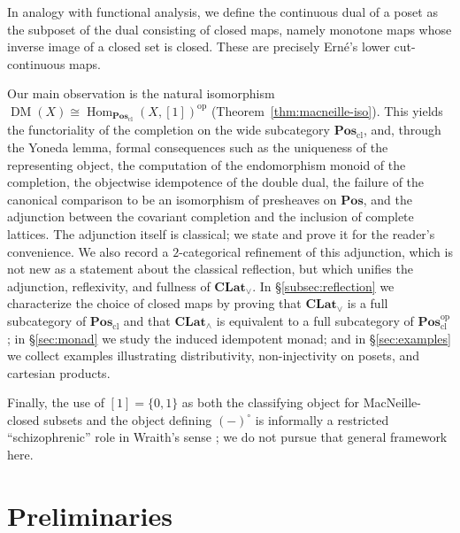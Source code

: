 \documentclass{amsart}
\theoremstyle{plain}
\theoremstyle{definition}
\theoremstyle{remark}
\DeclareMathOperator{\DM}{DM}
\DeclareMathOperator{\Hom}{Hom}
\begin{document}
In analogy with functional analysis, we define the continuous dual of a poset as the subposet of the dual consisting of closed maps, namely monotone maps whose inverse image of a closed set is closed. These are precisely Ern\'e's lower cut-continuous maps.

Our main observation is the natural isomorphism $\DM(X)\cong\Hom_{\mathbf{Pos}_{\mathrm{cl}}}(X,[1])^{\mathrm{op}}$ (Theorem~\ref{thm:macneille-iso}). This yields the functoriality of the completion on the wide subcategory $\mathbf{Pos}_{\mathrm{cl}}$, and, through the Yoneda lemma, formal consequences such as the uniqueness of the representing object, the computation of the endomorphism monoid of the completion, the objectwise idempotence of the double dual, the failure of the canonical comparison to be an isomorphism of presheaves on $\mathbf{Pos}$, and the adjunction between the covariant completion and the inclusion of complete lattices. The adjunction itself is classical; we state and prove it for the reader's convenience. We also record a $2$-categorical refinement of this adjunction, which is not new as a statement about the classical reflection, but which unifies the adjunction, reflexivity, and fullness of $\mathbf{CLat}_\vee$. In \S\ref{subsec:reflection} we characterize the choice of closed maps by proving that $\mathbf{CLat}_\vee$ is a full subcategory of $\mathbf{Pos}_{\mathrm{cl}}$ and that $\mathbf{CLat}_\wedge$ is equivalent to a full subcategory of $\mathbf{Pos}_{\mathrm{cl}}^{\mathrm{op}}$; in \S\ref{sec:monad} we study the induced idempotent monad; and in \S\ref{sec:examples} we collect examples illustrating distributivity, non-injectivity on posets, and cartesian products.

Finally, the use of $[1]=\{0,1\}$ as both the classifying object for MacNeille-closed subsets and the object defining $(-)^\circ$ is informally a restricted ``schizophrenic'' role in Wraith's sense \cite{wraith1993using}; we do not pursue that general framework here.

\section{Preliminaries}\label{sec:prelim}
\end{document}
